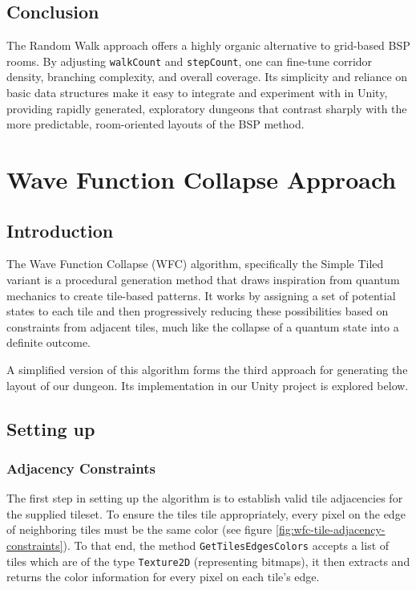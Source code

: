 \documentclass[a4paper, 12pt, one column, aas_macros]{article}
\begin{document}
\subsection{Conclusion}
The Random Walk approach offers a highly organic alternative to grid-based BSP rooms. By adjusting \texttt{walkCount} and \texttt{stepCount}, one can fine-tune corridor density, branching complexity, and overall coverage. Its simplicity and reliance on basic data structures make it easy to integrate and experiment with in Unity, providing rapidly generated, exploratory dungeons that contrast sharply with the more predictable, room-oriented layouts of the BSP method.

\section{Wave Function Collapse Approach}
\subsection{Introduction}
The Wave Function Collapse (WFC) algorithm, specifically the Simple Tiled variant is a procedural generation method that draws inspiration from quantum mechanics to create tile-based patterns. It works by assigning a set of potential states to each tile and then progressively reducing these possibilities based on constraints from adjacent tiles, much like the collapse of a quantum state into a definite outcome. 

A simplified version of this algorithm forms the third approach for generating the layout of our dungeon. Its implementation in our Unity project is explored below.

\subsection{Setting up}
\subsubsection{Adjacency Constraints}
The first step in setting up the algorithm is to establish valid tile adjacencies for the supplied tileset. To ensure the tiles tile appropriately, every pixel on the edge of neighboring tiles must be the same color (see figure \ref{fig:wfc-tile-adjacency-constraints}). To that end, the method \texttt{GetTilesEdgesColors} accepts a list of tiles which are of the type \texttt{Texture2D} (representing bitmaps), it then extracts and returns the color information for every pixel on each tile's edge.
\end{document}
